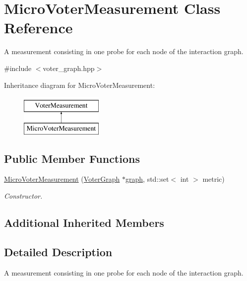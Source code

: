 \hypertarget{class_micro_voter_measurement}{}\section{Micro\+Voter\+Measurement Class Reference}
\label{class_micro_voter_measurement}


A measurement consisting in one probe for each node of the interaction graph.  




{\ttfamily \#include $<$voter\+\_\+graph.\+hpp$>$}

Inheritance diagram for Micro\+Voter\+Measurement\+:\begin{figure}[H]
\begin{center}
\leavevmode
\includegraphics[height=2.000000cm]{class_micro_voter_measurement}
\end{center}
\end{figure}
\subsection*{Public Member Functions}
\begin{DoxyCompactItemize}
\item 
\hyperlink{class_micro_voter_measurement_a6fd28685ad94d46417978b6d13365d84}{Micro\+Voter\+Measurement} (\hyperlink{class_voter_graph}{Voter\+Graph} $\ast$\hyperlink{class_voter_measurement_a8d22d4b78f7e2f4c747f5716c4885351}{graph}, std\+::set$<$ int $>$ metric)
\begin{DoxyCompactList}\small\item\em Constructor. \end{DoxyCompactList}\end{DoxyCompactItemize}
\subsection*{Additional Inherited Members}


\subsection{Detailed Description}
A measurement consisting in one probe for each node of the interaction graph. 

